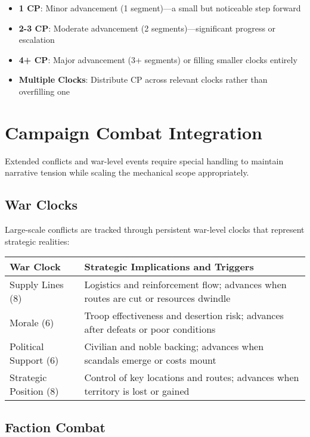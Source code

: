 \begin{itemize}
    \item \textbf{1 CP}: Minor advancement (1 segment)—a small but noticeable step forward
    \item \textbf{2-3 CP}: Moderate advancement (2 segments)—significant progress or escalation
    \item \textbf{4+ CP}: Major advancement (3+ segments) or filling smaller clocks entirely
    \item \textbf{Multiple Clocks}: Distribute CP across relevant clocks rather than overfilling one
\end{itemize}

\section*{Campaign Combat Integration}

Extended conflicts and war-level events require special handling to maintain narrative tension while scaling the mechanical scope appropriately.

\subsection*{War Clocks}

Large-scale conflicts are tracked through persistent war-level clocks that represent strategic realities:

\begin{fatebox}
\begin{tabularx}{\textwidth}{lX}
\toprule
\textbf{War Clock} & \textbf{Strategic Implications and Triggers} \\
\midrule
Supply Lines (8) & Logistics and reinforcement flow; advances when routes are cut or resources dwindle \\
Morale (6) & Troop effectiveness and desertion risk; advances after defeats or poor conditions \\
Political Support (6) & Civilian and noble backing; advances when scandals emerge or costs mount \\
Strategic Position (8) & Control of key locations and routes; advances when territory is lost or gained \\
\bottomrule
\end{tabularx}
\end{fatebox}

\subsection*{Faction Combat}

